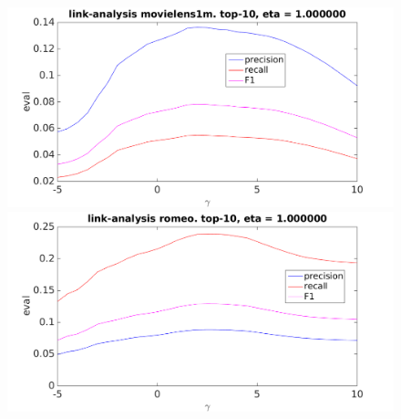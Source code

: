 \begin{figure}[h!]
\centering
\begin{minipage}{.5\textwidth}
    \centering
    \includegraphics[width=\linewidth]{fig/link_gamma/movielens_link_gamma.png}
\end{minipage}%
\begin{minipage}{.5\textwidth}
    \centering
    \includegraphics[width=\linewidth]{fig/link_gamma/romeo_link_gamma.png}
\end{minipage}
\end{figure}

\FloatBarrier
